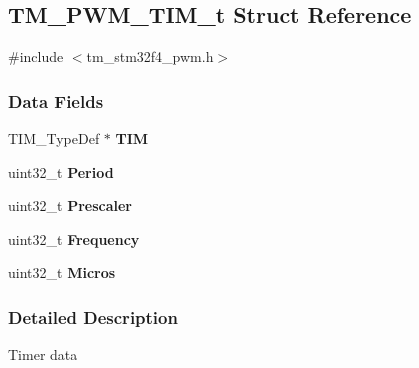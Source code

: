 \hypertarget{struct_t_m___p_w_m___t_i_m__t}{}\subsection{T\+M\+\_\+\+P\+W\+M\+\_\+\+T\+I\+M\+\_\+t Struct Reference}
\label{struct_t_m___p_w_m___t_i_m__t}


{\ttfamily \#include $<$tm\+\_\+stm32f4\+\_\+pwm.\+h$>$}

\subsubsection*{Data Fields}
\begin{DoxyCompactItemize}
\item 
\hypertarget{struct_t_m___p_w_m___t_i_m__t_ae84f988a5d19bcf60544a3d0934ccf02}{}T\+I\+M\+\_\+\+Type\+Def $\ast$ {\bfseries T\+I\+M}\label{struct_t_m___p_w_m___t_i_m__t_ae84f988a5d19bcf60544a3d0934ccf02}

\item 
\hypertarget{struct_t_m___p_w_m___t_i_m__t_a49500eef6a2354eeee4adc005bf9cef6}{}uint32\+\_\+t {\bfseries Period}\label{struct_t_m___p_w_m___t_i_m__t_a49500eef6a2354eeee4adc005bf9cef6}

\item 
\hypertarget{struct_t_m___p_w_m___t_i_m__t_affb82025da5b8d4a06e61f1690460f4d}{}uint32\+\_\+t {\bfseries Prescaler}\label{struct_t_m___p_w_m___t_i_m__t_affb82025da5b8d4a06e61f1690460f4d}

\item 
\hypertarget{struct_t_m___p_w_m___t_i_m__t_ade3d190636488dad9a89b19446b7acf1}{}uint32\+\_\+t {\bfseries Frequency}\label{struct_t_m___p_w_m___t_i_m__t_ade3d190636488dad9a89b19446b7acf1}

\item 
\hypertarget{struct_t_m___p_w_m___t_i_m__t_aaf0e4ad527f6f760784d14fdeb299c75}{}uint32\+\_\+t {\bfseries Micros}\label{struct_t_m___p_w_m___t_i_m__t_aaf0e4ad527f6f760784d14fdeb299c75}

\end{DoxyCompactItemize}


\subsubsection{Detailed Description}
Timer data

